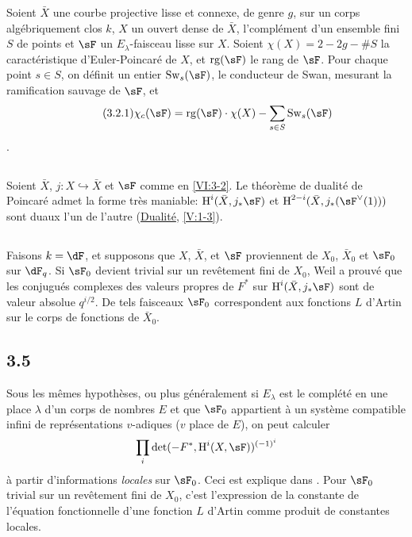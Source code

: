 Soient $\bar X$ une courbe projective lisse et connexe, de genre $g$, sur un 
corps alg\'ebriquement clos $k$, $X$ un ouvert dense de $\bar X$, 
l'compl\'ement d'un ensemble fini $S$ de points et $\sF$ un 
$E_\lambda$-faisceau lisse sur $X$. Soient $\chi(X)=2-2 g-\# S$ la 
caract\'eristique d'Euler-Poincar\'e de $X$, et $\operatorname{rg}(\sF)$ le 
rang de $\sF$. Pour chaque point $s\in S$, on d\'efinit un entier 
$\swan_s(\sF)$, le conducteur de Swan, mesurant la ramification sauvage de 
$\sF$, et 
\begin{align*}\tag{3.2.1}\label{VI:eq:3-2-1}
  \chi_c(\sF) = \operatorname{rg}(\sF) \cdot \chi(X) - \sum_{s\in S} \swan_s(\sF) 
\end{align*}
\cite{ra65}. 





\subsection{}\label{VI:3-3}

Soient $\bar X$, $j:X\hookrightarrow\bar X$ et $\sF$ comme en \ref{VI:3-2}. Le 
th\'eor\`eme de dualit\'e de Poincar\'e admet la forme tr\`es maniable: 
$\h^i(\bar X,j_\ast \sF)$ et $\h^{2-i}(\bar X,j_\ast(\sF^\vee(1)))$ sont 
duaux l'un de l'autre (\hyperlink{V}{Dualit\'e}, \ref{V:1-3}). 





\subsection{}\label{VI:3-4}

Faisons $k=\dF$, et supposons que $X$, $\bar X$, et $\sF$ proviennent de 
$X_0$, $\bar X_0$ et $\sF_0$ sur $\dF_q$. Si $\sF_0$ devient trivial sur un 
rev\^etement fini de $X_0$, Weil a prouv\'e que les conjugu\'es complexes des 
valeurs propres de $F^\ast$ sur $\h^i(\bar X,j_\ast\sF)$ sont de valeur 
absolue $q^{i/2}$. De tels faisceaux $\sF_0$ correspondent aux fonctions $L$ 
d'Artin sur le corps de fonctions de $\bar X_0$. 





\subsection*{3.5}\label{VI:3-5_} %

Sous les m\^emes hypoth\`eses, ou plus g\'en\'eralement si $E_\lambda$ est le 
compl\'et\'e en une place $\lambda$ d'un corps de nombres $E$ et que $\sF_0$ 
appartient \`a un syst\`eme compatible infini de repr\'esentations $v$-adiques 
($v$ place de $E$), on peut calculer 
\[
  \prod_i \det(-F^\ast,\h^i(X,\sF))^{(-1)^i} 
\]
\`a partir d'informations \emph{locales} sur $\sF_0$. Ceci est explique dans 
\cite{de73}. Pour $\sF_0$ trivial sur un rev\^etement fini de $X_0$, c'est 
l'expression de la constante de l'\'equation fonctionnelle d'une fonction $L$ 
d'Artin comme produit de constantes locales. 





